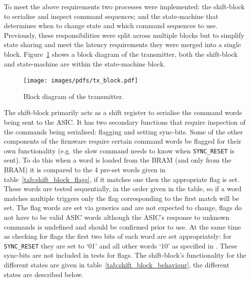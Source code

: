 To meet the above requirements two processes were implemented: the shift-block to serialise and inspect command sequences; and the state-machine that determines when to change state and which command sequences to use. Previously, these responsibilities were split across multiple blocks but to simplify state sharing and meet the latency requirements they were merged into a single block. Figure~\ref{fig:tx_block} shows a block diagram of the transmitter, both the shift-block and state-machine are within the state-machine block.
    
\begin{figure}[htbp]
  \centering
  \texttt{[image: images/pdfs/tx\_block.pdf]}
  \caption{Block diagram of the transmitter.}
  \label{fig:tx_block}
\end{figure}
        
The shift-block primarily acts as a shift register to serialise the command words being sent to the ASIC. It has two secondary functions that require inspection of the commands being serialised: flagging and setting sync-bits. Some of the other components of the firmware require certain command words be flagged for their own functionality (e.g. the slow command needs to know when \texttt{SYNC\_RESET} is sent). To do this when a word is loaded from the BRAM (and only from the BRAM) it is compared to the 4 pre-set words given in table~\ref{tab:shift_block_flags}, if it matches one then the appropriate flag is set. These words are tested sequentially, in the order given in the table, so if a word matches multiple triggers only the flag corresponding to the first match will be set. The flag words are set via generics and are not expected to change, flags do not have to be valid ASIC words although the ASIC's response to unknown commands is undefined and should be confirmed prior to use. At the same time as checking for flags the first two bits of each word are set appropriately: for \texttt{SYNC\_RESET} they are set to `01' and all other words `10' as specified in \cite{lpd_manual}. These sync-bits are not included in tests for flags. The shift-block's functionality for the different states are given in table~\ref{tab:shift_block_behaviour}, the different states are described below.


